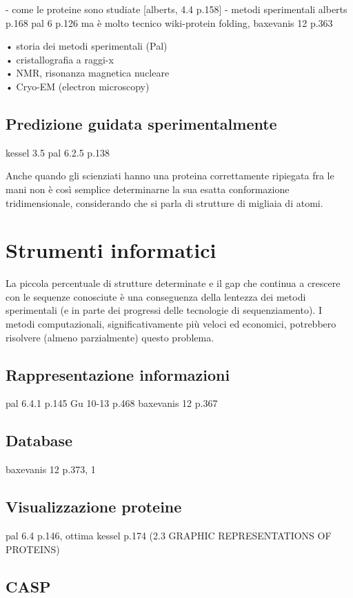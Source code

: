 - come le proteine sono studiate [alberts, 4.4 p.158]
- metodi sperimentali 
alberts p.168
pal 6 p.126 ma è molto tecnico
wiki-protein folding, 
baxevanis 12 p.363

• storia dei metodi sperimentali (Pal) \\
• cristallografia a raggi-x \\
• NMR, risonanza magnetica nucleare \\
• Cryo-EM (electron microscopy) \\
\subsection{Predizione guidata sperimentalmente}
kessel 3.5
pal 6.2.5 p.138

Anche quando gli scienziati hanno una proteina correttamente ripiegata fra le mani non è così semplice determinarne la sua esatta conformazione tridimensionale, considerando che si parla di strutture di migliaia di atomi.

\section{Strumenti informatici}
La piccola percentuale di strutture determinate e il gap che continua a crescere con le sequenze conosciute è una conseguenza della lentezza dei metodi sperimentali (e in parte dei progressi delle tecnologie di sequenziamento). I metodi computazionali, significativamente più veloci ed economici, potrebbero risolvere (almeno parzialmente) questo problema.

\subsection{Rappresentazione informazioni}
pal 6.4.1 p.145
Gu 10-13 p.468
baxevanis 12 p.367

\subsection{Database}
baxevanis 12 p.373, 1

\subsection{Visualizzazione proteine}
pal 6.4 p.146, ottima
kessel p.174 (2.3 GRAPHIC REPRESENTATIONS OF PROTEINS)
\subsection{CASP}

